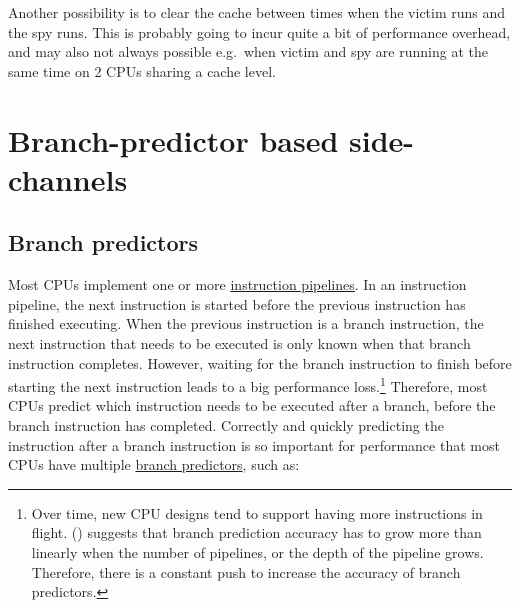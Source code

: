 \documentclass[
  a4paper,
]{report}
\begin{document}
Another possibility is to clear the cache between times when the victim
runs and the spy runs. This is probably going to incur quite a bit of
performance overhead, and may also not always possible e.g.~when victim
and spy are running at the same time on 2 CPUs sharing a cache level.

\section{Branch-predictor based
side-channels}\label{branch-predictor-based-side-channels}

\subsection{Branch predictors}\label{branch-predictors}

Most CPUs implement one or more
\href{https://en.wikipedia.org/wiki/Instruction_pipelining}{\label{__index_entry_141}{instruction
pipelines}}.
\label{__index_entry_142}{} In an
instruction pipeline, the next instruction is started before the
previous instruction has finished executing. When the previous
instruction is a branch instruction, the next instruction that needs to
be executed is only known when that branch instruction completes.
However, waiting for the branch instruction to finish before starting
the next instruction leads to a big performance loss.\footnote{Over
  time, new CPU designs tend to support having more instructions in
  flight. ()
  suggests that branch prediction accuracy has to grow more than
  linearly when the number of pipelines, or the depth of the pipeline
  grows. Therefore, there is a constant push to increase the accuracy of
  branch predictors.} Therefore, most CPUs
\label{__index_entry_143}{predict} which
instruction needs to be executed after a branch, before the branch
instruction has completed. Correctly and quickly predicting the
instruction after a branch instruction is so important for performance
that most CPUs have multiple
\href{https://en.wikipedia.org/wiki/Branch_predictor}{\label{__index_entry_144}{branch
predictors}}, such as:
\end{document}
